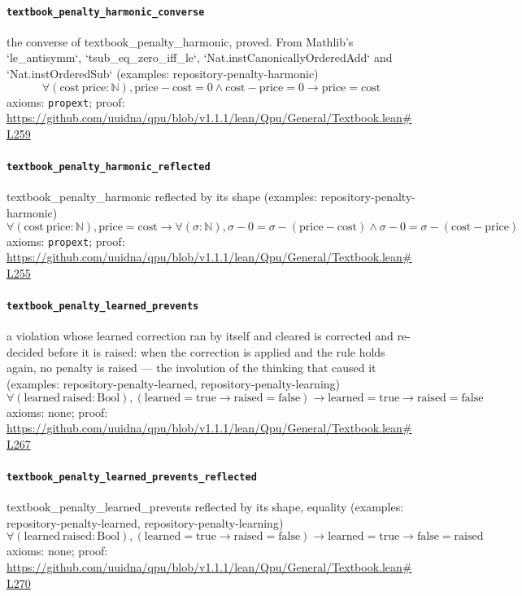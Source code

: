 \documentclass[11pt]{article}
\begin{document}
\paragraph{\texttt{textbook\_penalty\_harmonic\_converse}}
the converse of textbook\_penalty\_harmonic, proved. From Mathlib's `le\_antisymm`, `tsub\_eq\_zero\_iff\_le`, `Nat.instCanonicallyOrderedAdd` and `Nat.instOrderedSub` (examples: repository-penalty-harmonic)
\[ \forall (\mathrm{cost}\ \mathrm{price} : \mathbb{N}), \mathrm{price} - \mathrm{cost} = 0 \land \mathrm{cost} - \mathrm{price} = 0 \to \mathrm{price} = \mathrm{cost} \]
\noindent axioms: \texttt{propext}; proof: \url{https://github.com/uuidna/qpu/blob/v1.1.1/lean/Qpu/General/Textbook.lean\#L259}

\paragraph{\texttt{textbook\_penalty\_harmonic\_reflected}}
textbook\_penalty\_harmonic reflected by its shape (examples: repository-penalty-harmonic)
\[ \forall (\mathrm{cost}\ \mathrm{price} : \mathbb{N}), \mathrm{price} = \mathrm{cost} \to \forall (\sigma : \mathbb{N}), \sigma - 0 = \sigma - (\mathrm{price} - \mathrm{cost}) \land \sigma - 0 = \sigma - (\mathrm{cost} - \mathrm{price}) \]
\noindent axioms: \texttt{propext}; proof: \url{https://github.com/uuidna/qpu/blob/v1.1.1/lean/Qpu/General/Textbook.lean\#L255}

\paragraph{\texttt{textbook\_penalty\_learned\_prevents}}
a violation whose learned correction ran by itself and cleared is corrected and re-decided before it is raised: when the correction is applied and the rule holds again, no penalty is raised — the involution of the thinking that caused it (examples: repository-penalty-learned, repository-penalty-learning)
\[ \forall (\mathrm{learned}\ \mathrm{raised} : \mathrm{Bool}), (\mathrm{learned} = \mathrm{true} \to \mathrm{raised} = \mathrm{false}) \to \mathrm{learned} = \mathrm{true} \to \mathrm{raised} = \mathrm{false} \]
\noindent axioms: none; proof: \url{https://github.com/uuidna/qpu/blob/v1.1.1/lean/Qpu/General/Textbook.lean\#L267}

\paragraph{\texttt{textbook\_penalty\_learned\_prevents\_reflected}}
textbook\_penalty\_learned\_prevents reflected by its shape, equality (examples: repository-penalty-learned, repository-penalty-learning)
\[ \forall (\mathrm{learned}\ \mathrm{raised} : \mathrm{Bool}), (\mathrm{learned} = \mathrm{true} \to \mathrm{raised} = \mathrm{false}) \to \mathrm{learned} = \mathrm{true} \to \mathrm{false} = \mathrm{raised} \]
\noindent axioms: none; proof: \url{https://github.com/uuidna/qpu/blob/v1.1.1/lean/Qpu/General/Textbook.lean\#L270}
\end{document}
